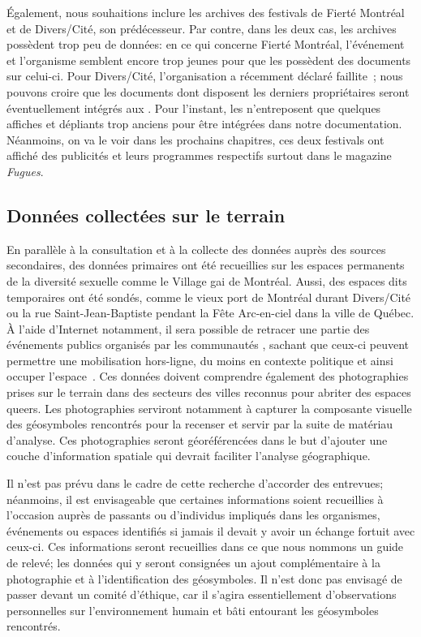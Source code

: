 Également, nous souhaitions inclure les archives des festivals de Fierté Montréal et de Divers/Cité, son prédécesseur.
Par contre, dans les deux cas, les archives possèdent trop peu de données: en ce qui concerne Fierté Montréal, l'événement et l'organisme semblent encore trop jeunes pour que les \agq{} possèdent des documents sur celui-ci.
Pour Divers/Cité, l'organisation a récemment déclaré faillite~\citep{Cormier2015}; nous pouvons croire que les documents dont disposent les derniers propriétaires seront éventuellement intégrés aux \agq{}.
Pour l'instant, les \agq{} n'entreposent que quelques affiches et dépliants trop anciens pour être intégrées dans notre documentation.
Néanmoins, on va le voir dans les prochains chapitres, ces deux festivals ont affiché des publicités et leurs programmes respectifs surtout dans le magazine \emph{Fugues}.

\subsection{Données collectées sur le terrain}
\label{sub:donnees_collectees_sur_le_terrain}

En parallèle à la consultation et à la collecte des données auprès des sources secondaires, des données primaires ont été recueillies sur les espaces permanents de la diversité sexuelle comme le Village gai de Montréal.
Aussi, des espaces dits temporaires ont été sondés, comme le vieux port de Montréal durant Divers/Cité ou la rue Saint-Jean-Baptiste pendant la Fête Arc-en-ciel dans la ville de Québec.
À l'aide d'Internet notamment, il sera possible de retracer une partie des événements publics organisés par les communautés \lgbt{}, sachant que ceux-ci peuvent permettre une mobilisation hors-ligne, du moins en contexte politique et ainsi occuper l'espace~\citep[153-154]{Mercea2011}.
Ces données doivent comprendre également des photographies prises sur le terrain dans des secteurs des villes reconnus pour abriter des espaces queers.
Les photographies serviront notamment à capturer la composante visuelle des géosymboles rencontrés pour la recenser et servir par la suite de matériau d'analyse.
Ces photographies seront géoréférencées dans le but d'ajouter une couche d'information spatiale qui devrait faciliter l'analyse géographique.

Il n'est pas prévu dans le cadre de cette recherche d'accorder des entrevues; néanmoins, il est envisageable que certaines informations soient recueillies à l'occasion auprès de passants ou d'individus impliqués dans les organismes, événements ou espaces identifiés si jamais il devait y avoir un échange fortuit avec ceux-ci.
Ces informations seront recueillies dans ce que nous nommons un guide de relevé; les données qui y seront consignées un ajout complémentaire à la photographie et à l'identification des géosymboles.
Il n'est donc pas envisagé de passer devant un comité d'éthique, car il s'agira essentiellement d'observations personnelles sur l'environnement humain et bâti entourant les géosymboles rencontrés.

